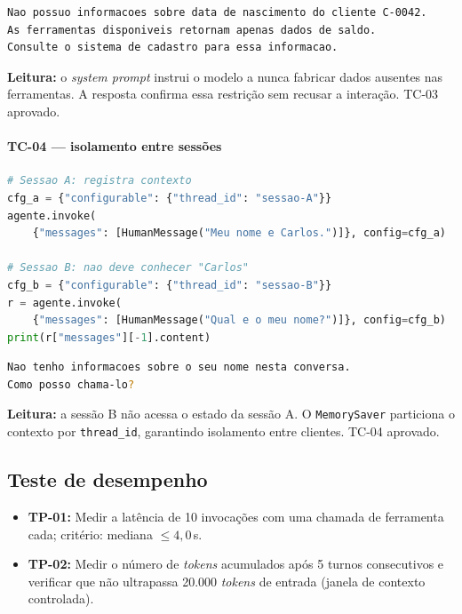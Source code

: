 \begin{lstlisting}[language=bash,
      caption={TC-03 --- recusa de inven\c{c}\~ao de dado ausente nas ferramentas.},
      label={lst:cap3_tc03_saida}]
Nao possuo informacoes sobre data de nascimento do cliente C-0042.
As ferramentas disponiveis retornam apenas dados de saldo.
Consulte o sistema de cadastro para essa informacao.
\end{lstlisting}

\noindent\textbf{Leitura:} o \textit{system prompt} instrui o modelo a
nunca fabricar dados ausentes nas ferramentas. A resposta confirma essa
restri\c{c}\~ao sem recusar a intera\c{c}\~ao. TC-03 aprovado.

\paragraph{TC-04 --- isolamento entre sess\~oes}

\begin{lstlisting}[language=Python,
      caption={TC-04 --- troca de \texttt{thread\_id} garante contexto zerado.},
      label={lst:cap3_tc04_codigo}]
# Sessao A: registra contexto
cfg_a = {"configurable": {"thread_id": "sessao-A"}}
agente.invoke(
    {"messages": [HumanMessage("Meu nome e Carlos.")]}, config=cfg_a)

# Sessao B: nao deve conhecer "Carlos"
cfg_b = {"configurable": {"thread_id": "sessao-B"}}
r = agente.invoke(
    {"messages": [HumanMessage("Qual e o meu nome?")]}, config=cfg_b)
print(r["messages"][-1].content)
\end{lstlisting}

\begin{lstlisting}[language=bash,
      caption={TC-04 --- sem vazamento de contexto entre sess\~oes distintas.},
      label={lst:cap3_tc04_saida}]
Nao tenho informacoes sobre o seu nome nesta conversa.
Como posso chama-lo?
\end{lstlisting}

\noindent\textbf{Leitura:} a sess\~ao B n\~ao acessa o estado da
sess\~ao A. O \texttt{MemorySaver} particiona o contexto por
\texttt{thread\_id}, garantindo isolamento entre clientes. TC-04 aprovado.

\subsection{Teste de desempenho}

\begin{itemize}[leftmargin=*]
  \item \textbf{TP-01:} Medir a lat\^encia de 10 invoca\c{c}\~oes
        com uma chamada de ferramenta cada; crit\'erio: mediana
        $\leq 4{,}0$\,s.
  \item \textbf{TP-02:} Medir o n\'umero de \textit{tokens}
        acumulados ap\'os 5 turnos consecutivos e verificar
        que n\~ao ultrapassa 20.000 \textit{tokens} de entrada
        (janela de contexto controlada).
\end{itemize}

